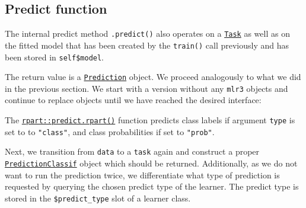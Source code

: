 \documentclass[]{scrbook}
\newenvironment{Shaded}{\begin{snugshade}}{\end{snugshade}}
\newcommand{\CommentTok}[1]{\textcolor[rgb]{0.56,0.35,0.01}{\textit{#1}}}
\newcommand{\DataTypeTok}[1]{\textcolor[rgb]{0.13,0.29,0.53}{#1}}
\newcommand{\KeywordTok}[1]{\textcolor[rgb]{0.13,0.29,0.53}{\textbf{#1}}}
\newcommand{\NormalTok}[1]{#1}
\newcommand{\OperatorTok}[1]{\textcolor[rgb]{0.81,0.36,0.00}{\textbf{#1}}}
\newcommand{\StringTok}[1]{\textcolor[rgb]{0.31,0.60,0.02}{#1}}
\renewenvironment{Shaded} {\begin{snugshade}\small} {\end{snugshade}}
\begin{document}
\hypertarget{learner-predict}{%
\subsection{Predict function}\label{learner-predict}}

The internal predict method \texttt{.predict()} also operates on a \href{https://mlr3.mlr-org.com/reference/Task.html}{\texttt{Task}} as well as on the fitted model that has been created by the \texttt{train()} call previously and has been stored in \texttt{self\$model}.

The return value is a \href{https://mlr3.mlr-org.com/reference/Prediction.html}{\texttt{Prediction}} object.
We proceed analogously to what we did in the previous section.
We start with a version without any \texttt{mlr3} objects and continue to replace objects until we have reached the desired interface:

\begin{Shaded}
\end{Shaded}

The \href{https://www.rdocumentation.org/packages/rpart/topics/predict.rpart}{\texttt{rpart::predict.rpart()}} function predicts class labels if argument \texttt{type} is set to to \texttt{"class"}, and class probabilities if set to \texttt{"prob"}.

Next, we transition from \texttt{data} to a \texttt{task} again and construct a proper \href{https://mlr3.mlr-org.com/reference/PredictionClassif.html}{\texttt{PredictionClassif}} object which should be returned.
Additionally, as we do not want to run the prediction twice, we differentiate what type of prediction is requested by querying the chosen predict type of the learner.
The predict type is stored in the \texttt{\$predict\_type} slot of a learner class.
\end{document}
